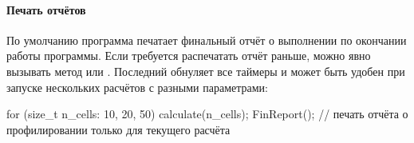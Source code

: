 \paragraph{Печать отчётов}
По умолчанию программа печатает
финальный отчёт о выполнении по окончании
работы программы.
Если требуется распечатать отчёт раньше, можно
явно вызывать метод  или
.
Последний обнуляет все таймеры и может быть удобен
при запуске нескольких расчётов с разными параметрами:
\begin{cppcode}
for (size_t n_cells: {10, 20, 50}){
    calculate(n_cells);
    FinReport();  // печать отчёта о профилировании только для текущего расчёта
}
\end{cppcode}
